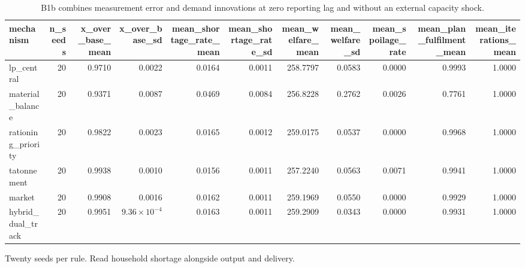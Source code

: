 \begin{table}[htbp]
\centering
\caption{B1b combines measurement error and demand innovations at zero reporting lag and without an external capacity shock.}
\label{tab:noise_only}
\begin{tabular}{lrrrrrrrrrr}
\toprule
mechanism & n\_seeds & x\_over\_base\_mean & x\_over\_base\_sd & mean\_shortage\_rate\_mean & mean\_shortage\_rate\_sd & mean\_welfare\_mean & mean\_welfare\_sd & mean\_spoilage\_rate & mean\_plan\_fulfilment\_mean & mean\_iterations\_mean \\
\midrule
lp\_central & 20 & 0.9710 & 0.0022 & 0.0164 & 0.0011 & 258.7797 & 0.0583 & 0.0000 & 0.9993 & 1.0000 \\
material\_balance & 20 & 0.9371 & 0.0087 & 0.0469 & 0.0084 & 256.8228 & 0.2762 & 0.0026 & 0.7761 & 1.0000 \\
rationing\_priority & 20 & 0.9822 & 0.0023 & 0.0165 & 0.0012 & 259.0175 & 0.0537 & 0.0000 & 0.9968 & 1.0000 \\
tatonnement & 20 & 0.9938 & 0.0010 & 0.0156 & 0.0011 & 257.2240 & 0.0563 & 0.0071 & 0.9941 & 1.0000 \\
market & 20 & 0.9908 & 0.0016 & 0.0162 & 0.0011 & 259.1969 & 0.0550 & 0.0000 & 0.9929 & 1.0000 \\
hybrid\_dual\_track & 20 & 0.9951 & $9.36\times10^{-4}$ & 0.0163 & 0.0011 & 259.2909 & 0.0343 & 0.0000 & 0.9931 & 1.0000 \\
\bottomrule
\end{tabular}
\par\smallskip
\begin{minipage}{\linewidth}\footnotesize Twenty seeds per rule. Read household shortage alongside output and delivery.\end{minipage}
\end{table}
